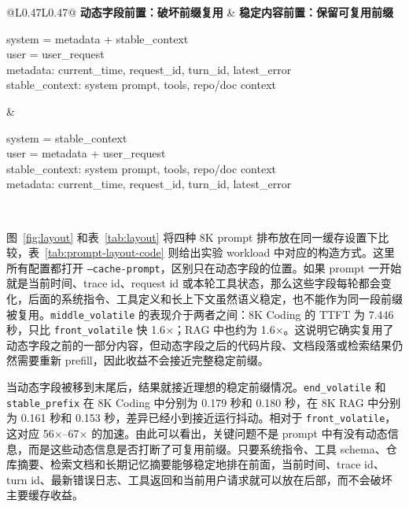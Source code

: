 \documentclass[10pt]{article}
\begin{document}
\begin{table}[H]
  \caption{实际 workload 中两类 prompt 组织方式的简化对比。}
  \label{tab:prompt-layout-code}
  \centering
  \scriptsize
  \setlength{\tabcolsep}{5pt}
  \begin{tabular}{@{}L{0.47\linewidth}L{0.47\linewidth}@{}}
    \toprule
    \textbf{动态字段前置：破坏前缀复用} & \textbf{稳定内容前置：保留可复用前缀} \\
    \midrule
    \begin{minipage}[t]{\linewidth}
      \raggedright\ttfamily
      system = metadata + stable\_context\\
      user = user\_request\\[2pt]
      metadata: current\_time, request\_id, turn\_id, latest\_error\\
      stable\_context: system prompt, tools, repo/doc context
    \end{minipage}
    &
    \begin{minipage}[t]{\linewidth}
      \raggedright\ttfamily
      system = stable\_context\\
      user = metadata + user\_request\\[2pt]
      stable\_context: system prompt, tools, repo/doc context\\
      metadata: current\_time, request\_id, turn\_id, latest\_error
    \end{minipage}
    \\
    \bottomrule
  \end{tabular}
\end{table}

图~\ref{fig:layout} 和表~\ref{tab:layout} 将四种 8K prompt 排布放在同一缓存设置下比较，表~\ref{tab:prompt-layout-code} 则给出实验 workload 中对应的构造方式。这里所有配置都打开 \texttt{--cache-prompt}，区别只在动态字段的位置。如果 prompt 一开始就是当前时间、trace id、request id 或本轮工具状态，那么这些字段每轮都会变化，后面的系统指令、工具定义和长上下文虽然语义稳定，也不能作为同一段前缀被复用。\texttt{middle\_volatile} 的表现介于两者之间：8K Coding 的 TTFT 为 7.446 秒，只比 \texttt{front\_volatile} 快 1.6$\times$；RAG 中也约为 1.6$\times$。这说明它确实复用了动态字段之前的一部分内容，但动态字段之后的代码片段、文档段落或检索结果仍然需要重新 prefill，因此收益不会接近完整稳定前缀。

当动态字段被移到末尾后，结果就接近理想的稳定前缀情况。\texttt{end\_volatile} 和 \texttt{stable\_prefix} 在 8K Coding 中分别为 0.179 秒和 0.180 秒，在 8K RAG 中分别为 0.161 秒和 0.153 秒，差异已经小到接近运行抖动。相对于 \texttt{front\_volatile}，这对应 56$\times$--67$\times$ 的加速。由此可以看出，关键问题不是 prompt 中有没有动态信息，而是这些动态信息是否打断了可复用前缀。只要系统指令、工具 schema、仓库摘要、检索文档和长期记忆摘要能够稳定地排在前面，当前时间、trace id、turn id、最新错误日志、工具返回和当前用户请求就可以放在后部，而不会破坏主要缓存收益。
\end{document}
